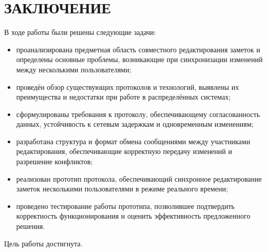 \chapter*{\textbf{ЗАКЛЮЧЕНИЕ}}

В ходе работы были решены следующие задачи:

\begin{itemize}
    \item проанализирована предметная область совместного редактирования заметок и определены основные проблемы, возникающие при синхронизации изменений между несколькими пользователями;
    \item проведён обзор существующих протоколов и технологий, выявлены их преимущества и недостатки при работе в распределённых системах;
    \item сформулированы требования к протоколу, обеспечивающему согласованность данных, устойчивость к сетевым задержкам и одновременным изменениям;
    \item разработана структура и формат обмена сообщениями между участниками редактирования, обеспечивающие корректную передачу изменений и разрешение конфликтов;
    \item реализован прототип протокола, обеспечивающий синхронное редактирование заметок несколькими пользователями в режиме реального времени;
    \item проведено тестирование работы прототипа, позволившее подтвердить корректность функционирования и оценить эффективность предложенного решения.
\end{itemize}

Цель работы достигнута.
